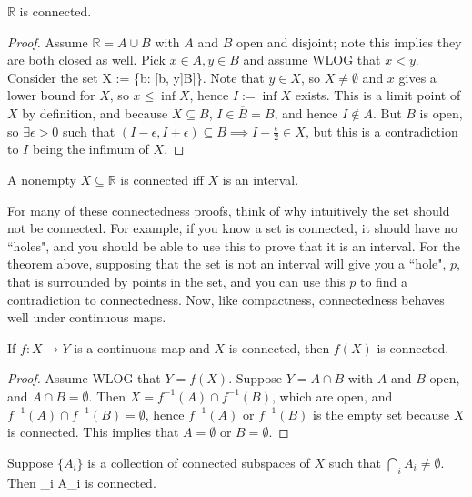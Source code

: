 	\begin{theorem}
		$\mathbb R$ is connected.
	\end{theorem}
	
	\begin{proof}
		Assume $\mathbb R = A\cup B$ with $A$ and $B$ open and disjoint; note this implies they are both closed as well. Pick $x\in A, y\in B$ and assume 
		WLOG that $x < y$. Consider the set
		\eq
			X := \{b\in [x, y]: [b, y]\subseteq B]\}.
		\qe
		Note that $y\in X$, so $X\neq\emptyset$ and $x$ gives a lower bound for $X$, so $x\leq\inf X$, hence $I := \inf X$ 
		exists. This is a limit point of $X$ by definition, and because $X\subseteq B$, $I\in\overline B = B$, and hence $I
		\notin A$. But $B$ is open, so $\exists\epsilon > 0$ such that $(I - \epsilon, I + \epsilon)\subseteq B\implies I-
		\frac{\epsilon}{2}\in X$, but this is a contradiction to $I$ being the infimum of $X$.
	\end{proof}
	
	\begin{prop}
		A nonempty $X\subseteq\mathbb R$ is connected iff $X$ is an interval.
	\end{prop}
	
	For many of these connectedness proofs, think of why intuitively the set should not be connected. For example, if you 
	know a set is connected, it should have no ``holes", and you should be able to use this to prove that it is an interval. For 
	the theorem above, supposing that the set is not an interval will give you a ``hole", $p$, that is surrounded by points in 
	the set, and you can use this $p$ to find a contradiction to connectedness. Now, like compactness, connectedness 
	behaves well under continuous maps.
	
	\begin{prop}
		If $f : X\rightarrow Y$ is a continuous map and $X$ is connected, then $f(X)$ is connected.
	\end{prop}
	
	\begin{proof}
		Assume WLOG that $Y = f(X)$. Suppose $Y = A\cap B$ with $A$ and $B$ open, and $A\cap B = \emptyset$. Then $X = f^{-1}(A)\cap f^{-1}(B)$, which 
		are open, and $f^{-1}(A)\cap f^{-1}(B) = \emptyset$, hence $f^{-1}(A)$ or $f^{-1}(B)$ is the empty set because $X$ is connected. This implies that 
		$A = \emptyset$ or $B = \emptyset$. 
	\end{proof}
	
	\begin{lemma}
		Suppose $\{A_i\}$ is a collection of connected subspaces of $X$ such that $\bigcap_i A_i\neq\emptyset$. Then 
		\eq
			\bigcup_i A_i
		\qe
		is connected.
	\end{lemma}
	
